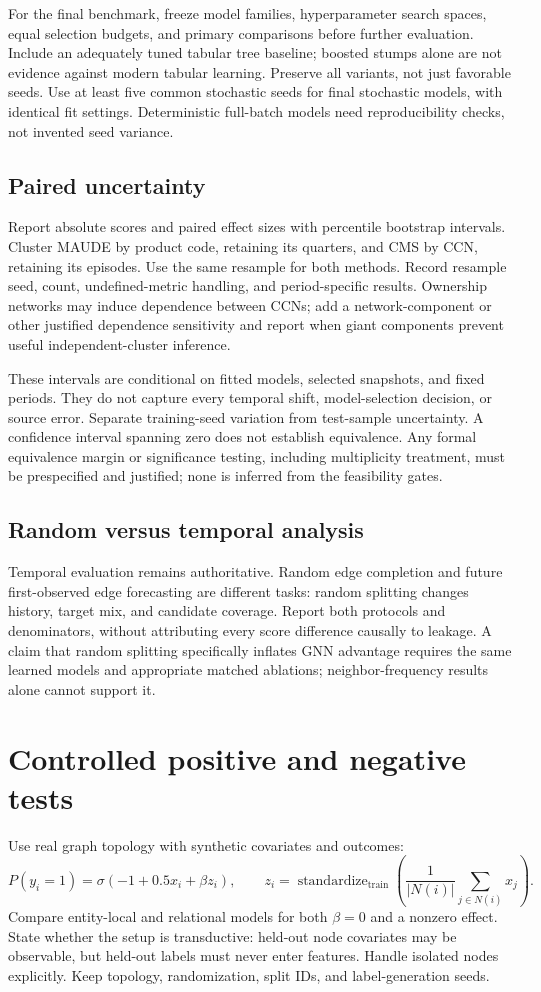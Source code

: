 \documentclass[11pt,a4paper]{article}
\begin{document}
For the final benchmark, freeze model families, hyperparameter search spaces, equal selection budgets, and primary comparisons before further evaluation. Include an adequately tuned tabular tree baseline; boosted stumps alone are not evidence against modern tabular learning. Preserve all variants, not just favorable seeds. Use at least five common stochastic seeds for final stochastic models, with identical fit settings. Deterministic full-batch models need reproducibility checks, not invented seed variance.

\subsection{Paired uncertainty}
Report absolute scores and paired effect sizes with percentile bootstrap intervals. Cluster MAUDE by product code, retaining its quarters, and CMS by CCN, retaining its episodes. Use the same resample for both methods. Record resample seed, count, undefined-metric handling, and period-specific results. Ownership networks may induce dependence between CCNs; add a network-component or other justified dependence sensitivity and report when giant components prevent useful independent-cluster inference.

These intervals are conditional on fitted models, selected snapshots, and fixed periods. They do not capture every temporal shift, model-selection decision, or source error. Separate training-seed variation from test-sample uncertainty. A confidence interval spanning zero does not establish equivalence. Any formal equivalence margin or significance testing, including multiplicity treatment, must be prespecified and justified; none is inferred from the feasibility gates.

\subsection{Random versus temporal analysis}
Temporal evaluation remains authoritative. Random edge completion and future first-observed edge forecasting are different tasks: random splitting changes history, target mix, and candidate coverage. Report both protocols and denominators, without attributing every score difference causally to leakage. A claim that random splitting specifically inflates GNN advantage requires the same learned models and appropriate matched ablations; neighbor-frequency results alone cannot support it.

\section{Controlled positive and negative tests}
Use real graph topology with synthetic covariates and outcomes:
\[
P(y_i=1)=\sigma(-1+0.5x_i+\beta z_i),\qquad
z_i=\operatorname{standardize}_{\mathrm{train}}\left(\frac{1}{|N(i)|}\sum_{j\in N(i)}x_j\right).
\]
Compare entity-local and relational models for both $\beta=0$ and a nonzero effect. State whether the setup is transductive: held-out node covariates may be observable, but held-out labels must never enter features. Handle isolated nodes explicitly. Keep topology, randomization, split IDs, and label-generation seeds.
\end{document}
